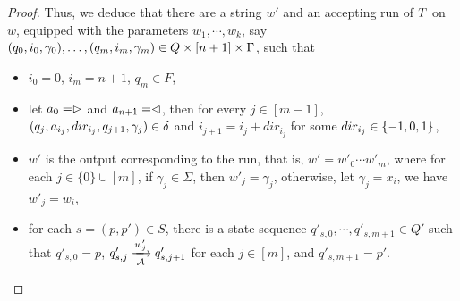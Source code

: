 \begin{proof}
Thus, we deduce that 
there are a string $w' $ and an accepting run of $T$ on $w$, equipped with the parameters $w_1,\cdots, w_k$, say $(q_0, i_0, \gamma_0),\ldots, (q_m, i_m, \gamma_m) \in Q \times [n+1] \times \Gamma$, such that 
%
\begin{itemize}
\item $i_0=0$, $i_m = n+1$, $q_m \in F$,
%
\item let $a_0 = \vartriangleright$ and $a_{n+1} = \vartriangleleft$,  then for every $j \in [m-1]$, $(q_j, a_{i_j}, dir_{i_j}, q_{j+1}, \gamma_j) \in
        \delta$ and $i_{j+1} = i_j + dir_{i_j}$ for some $dir_{i_j} \in \{-1, 0, 1\}$, 
 \item $w'$ is the output corresponding to the run, that is, $ w' = w'_0 \cdots w'_m$, where for each $j \in \{0\} \cup [m]$, if $\gamma_j \in \Sigma$, then $w'_j = \gamma_j$, otherwise, let $\gamma_j = x_i$, we have $w'_j = w_i$,
 \item  for each $s=(p, p') \in S$, there is a state sequence $q'_{s,0}, \cdots, q'_{s,m+1} \in Q'$ such that  $q'_{s,0}= p$, $q'_{s,j} \xrightarrow[\mathcal{A}]{w'_j} q'_{s, j+1}$ for each $j \in [m]$,  and $q'_{s, m+1} = p'$.
\end{itemize}


\end{proof}
